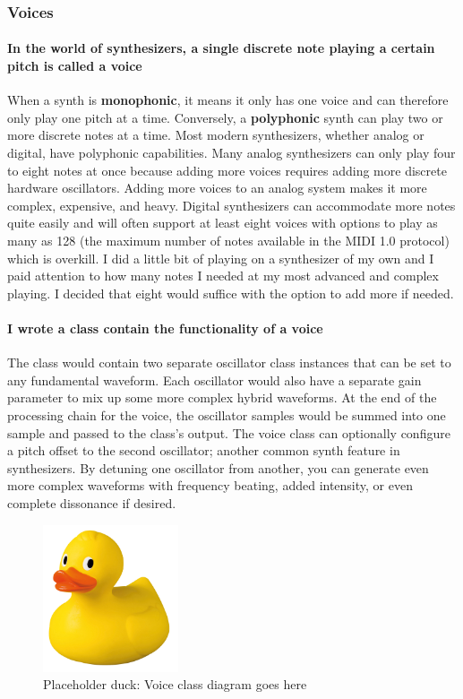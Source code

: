 \documentclass[acmlarge,screen]{acmart}
\begin{document}
	\subsubsection{Voices}
	\paragraph{In the world of synthesizers, a single discrete note playing a certain pitch is called a voice} When a synth is \textbf{monophonic}, it means it only has one voice and can therefore only play one pitch at a time. Conversely, a \textbf{polyphonic} synth can play two or more discrete notes at a time. Most modern synthesizers, whether analog or digital, have polyphonic capabilities. Many analog synthesizers can only play four to eight notes at once because adding more voices requires adding more discrete hardware oscillators. Adding more voices to an analog system makes it more complex, expensive, and heavy. Digital synthesizers can accommodate more notes quite easily and will often support at least eight voices with options to play as many as 128 (the maximum number of notes available in the MIDI 1.0 protocol) which is overkill. I did a little bit of playing on a synthesizer of my own and I paid attention to how many notes I needed at my most advanced and complex playing. I decided that eight would suffice with the option to add more if needed.
	
	\paragraph{I wrote a class contain the functionality of a voice} The class would contain two separate oscillator class instances that can be set to any fundamental waveform. Each oscillator would also have a separate gain parameter to mix up some more complex hybrid waveforms. At the end of the processing chain for the voice, the oscillator samples would be summed into one sample and passed to the class's output. The voice class can optionally configure a pitch offset to the second oscillator; another common synth feature in synthesizers. By detuning one oscillator from another, you can generate even more complex waveforms with frequency beating, added intensity, or even complete dissonance if desired.

	\begin{figure}[H]
		\includegraphics[width=4cm]{placeholder_duck}
		\caption{Placeholder duck: Voice class diagram goes here}
		\centering
	\end{figure}
\end{document}
